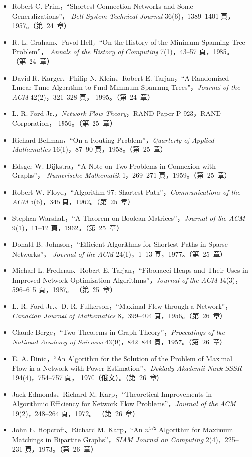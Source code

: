 \begin{itemize}
頁，1956。（第~24~章）
\item Robert C. Prim，``Shortest Connection Networks and Some Generalizations''，
\textit{Bell System Technical Journal} 36(6)，1389--1401 頁，1957。（第~24~章）
\item R. L. Graham、Pavol Hell，``On the History of the Minimum Spanning Tree Problem''，
\textit{Annals of the History of Computing} 7(1)，43--57 頁，1985。（第~24~章）
\item David R. Karger、Philip N. Klein、Robert E. Tarjan，``A Randomized Linear-Time
Algorithm to Find Minimum Spanning Trees''，\textit{Journal of the ACM} 42(2)，321--328 頁，
1995。（第~24~章）
\item L. R. Ford Jr.，\textit{Network Flow Theory}，RAND Paper P-923，RAND Corporation，
1956。（第~25~章）
\item Richard Bellman，``On a Routing Problem''，\textit{Quarterly of Applied Mathematics}
16(1)，87--90 頁，1958。（第~25~章）
\item Edsger W. Dijkstra，``A Note on Two Problems in Connexion with Graphs''，
\textit{Numerische Mathematik} 1，269--271 頁，1959。（第~25~章）
\item Robert W. Floyd，``Algorithm 97: Shortest Path''，\textit{Communications of the ACM}
5(6)，345 頁，1962。（第~25~章）
\item Stephen Warshall，``A Theorem on Boolean Matrices''，\textit{Journal of the ACM}
9(1)，11--12 頁，1962。（第~25~章）
\item Donald B. Johnson，``Efficient Algorithms for Shortest Paths in Sparse Networks''，
\textit{Journal of the ACM} 24(1)，1--13 頁，1977。（第~25~章）
\item Michael L. Fredman、Robert E. Tarjan，``Fibonacci Heaps and Their Uses in Improved
Network Optimization Algorithms''，\textit{Journal of the ACM} 34(3)，596--615 頁，1987。
（第~25~章）
\item L. R. Ford Jr.、D. R. Fulkerson，``Maximal Flow through a Network''，
\textit{Canadian Journal of Mathematics} 8，399--404 頁，1956。（第~26~章）
\item Claude Berge，``Two Theorems in Graph Theory''，\textit{Proceedings of the National
Academy of Sciences} 43(9)，842--844 頁，1957。（第~26~章）
\item E. A. Dinic，``An Algorithm for the Solution of the Problem of Maximal Flow in a
Network with Power Estimation''，\textit{Doklady Akademii Nauk SSSR} 194(4)，754--757 頁，
1970（俄文）。（第~26~章）
\item Jack Edmonds、Richard M. Karp，``Theoretical Improvements in Algorithmic Efficiency
for Network Flow Problems''，\textit{Journal of the ACM} 19(2)，248--264 頁，1972。
（第~26~章）
\item John E. Hopcroft、Richard M. Karp，``An $n^{5/2}$ Algorithm for Maximum Matchings in
Bipartite Graphs''，\textit{SIAM Journal on Computing} 2(4)，225--231 頁，1973。（第~26~章）
\end{itemize}

